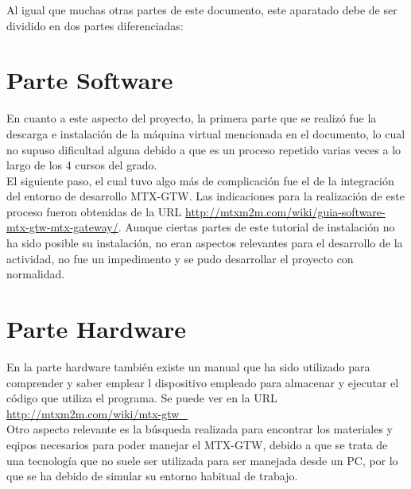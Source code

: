 
Al igual que muchas otras partes de este documento, este aparatado debe de ser dividido en dos partes diferenciadas:

\section{Parte Software}

En cuanto a este aspecto del proyecto, la primera parte que se realizó fue la descarga e instalación de la máquina virtual mencionada en el documento, lo cual no supuso dificultad alguna debido a que es un proceso repetido varias veces a lo largo de los 4 cursos del grado.\\
El siguiente paso, el cual tuvo algo más de complicación fue el de la integración del entorno de desarrollo MTX-GTW. Las indicaciones para la realización de este proceso fueron obtenidas de la URL \url{http://mtxm2m.com/wiki/guia-software-mtx-gtw-mtx-gateway/}. Aunque ciertas partes de este tutorial de instalación no ha sido posible su instalación, no eran aspectos relevantes para el desarrollo de la actividad, no fue un impedimento y se pudo desarrollar el proyecto con normalidad.\\

\section{Parte Hardware}

En la parte hardware también existe un manual que ha sido utilizado para comprender y saber emplear l dispositivo empleado para almacenar y ejecutar el código que utiliza el programa. Se puede ver en la URL \url{ http://mtxm2m.com/wiki/mtx-gtw_}\\
Otro aspecto relevante es la búsqueda realizada para encontrar los materiales y eqipos necesarios para poder manejar el MTX-GTW, debido a que se trata de una tecnología que no suele ser utilizada para ser manejada desde un PC, por lo que se ha debido de simular su entorno habitual de trabajo.\\